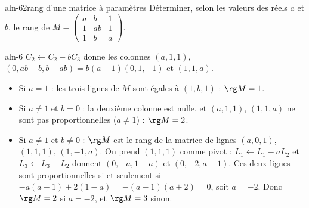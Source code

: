 \begin{exo}{aln-6}{2}{rang d'une matrice à paramètres}
Déterminer, selon les valeurs des réels $a$ et $b$, le rang de $M=\begin{pmatrix}a&b&1\\1&ab&1\\1&b&a\end{pmatrix}$.
\end{exo}
\begin{corrige}{aln-6}
$C_2\leftarrow C_2-bC_3$ donne les colonnes $(a,1,1)$, $(0,ab-b,b-ab)=b(a-1)(0,1,-1)$ et $(1,1,a)$.
\begin{itemize}
\item Si $a=1$ : les trois lignes de $M$ sont égales à $(1,b,1)$ : $\rg M=1$.
\item Si $a\neq1$ et $b=0$ : la deuxième colonne est nulle, et $(a,1,1)$, $(1,1,a)$ ne sont pas proportionnelles ($a\neq1$) : $\rg M=2$.
\item Si $a\neq1$ et $b\neq0$ : $\rg M$ est le rang de la matrice de lignes $(a,0,1)$, $(1,1,1)$, $(1,-1,a)$. On prend $(1,1,1)$
comme pivot : $L_1\leftarrow L_1-aL_2$ et $L_3\leftarrow L_3-L_2$ donnent $(0,-a,1-a)$ et $(0,-2,a-1)$. Ces deux lignes sont
proportionnelles si et seulement si $-a(a-1)+2(1-a)=-(a-1)(a+2)=0$, soit $a=-2$. Donc $\rg M=2$ si $a=-2$, et $\rg M=3$ sinon.
\end{itemize}
\end{corrige}

